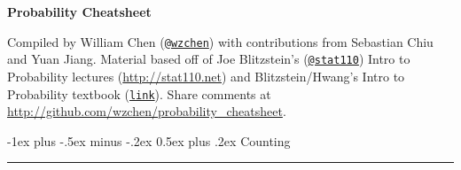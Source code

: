 \documentclass[10pt,landscape]{article}
\makeatletter
\theoremstyle{definition}
\renewcommand{\section}{\@startsection{section}{1}{0mm}%
                                {-1ex plus -.5ex minus -.2ex}%
                                {0.5ex plus .2ex}%
                                {\normalfont\large\bfseries}}
\renewcommand{\subsection}{\@startsection{subsection}{2}{0mm}%
                                {-1explus -.5ex minus -.2ex}%
                                {0.5ex plus .2ex}%
                                {\normalfont\normalsize\bfseries}}
\makeatother
\begin{document}
\raggedright
\footnotesize
\begin{multicols}{3}


\setlength{\premulticols}{1pt}
\setlength{\postmulticols}{1pt}
\setlength{\multicolsep}{1pt}
\setlength{\columnsep}{2pt}


\begin{center}
     \Large{\textbf{Probability Cheatsheet}} \\
\end{center}


\scriptsize

Compiled by William Chen (\texttt{\href{http://twitter.com/wzchen}{@wzchen}}) with contributions from Sebastian Chiu and Yuan Jiang. Material based off of Joe Blitzstein's (\texttt{\href{http://twitter.com/stat110}{@stat110}}) Intro to Probability lectures (\url{http://stat110.net}) and Blitzstein/Hwang's Intro to Probability textbook (\texttt{\href{http://www.crcpress.com/product/isbn/9781466575578}{link}}). Share comments at \url{http://github.com/wzchen/probability_cheatsheet}. 




\section{Counting}\smallskip \hrule height 2pt \smallskip



\end{multicols}
\end{document}
